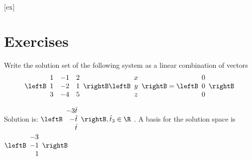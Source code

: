 [ex]
\section*{Exercises}

\begin{enumialphparenastyle}

\begin{ex} \label{exerlineartransf2}Write the solution set of the following system as a linear combination of vectors  
\begin{equation*}
\leftB
\begin{array}{rrr}
1 & -1 & 2 \\
1 & -2 & 1 \\
3 & -4 & 5
\end{array}
\rightB \leftB
\begin{array}{c}
x \\
y \\
z
\end{array}
\rightB =\leftB
\begin{array}{r}
0 \\
0 \\
0
\end{array}
\rightB 
\end{equation*}
\begin{sol}
Solution is: $\leftB
\begin{array}{r}
-3\hat{t} \\
-\hat{t} \\
\hat{t}
\end{array}
\rightB ,\hat{t}_{3}\in \R$ . A basis for the solution space is $
\leftB
\begin{array}{r}
-3 \\
-1 \\
1
\end{array}
\rightB$
\end{sol}
\end{ex}


\end{enumialphparenastyle}
